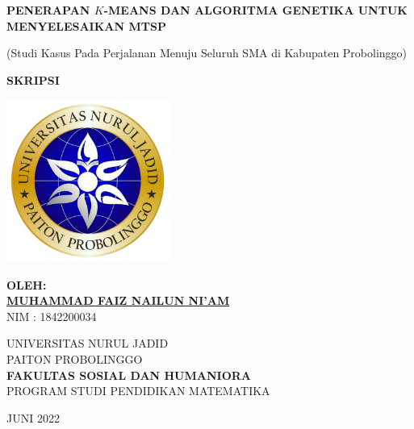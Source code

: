 \begin{titlepage}
   \begin{center}

       \textbf{PENERAPAN $K$-MEANS DAN ALGORITMA GENETIKA UNTUK MENYELESAIKAN MTSP}
       
       (Studi Kasus Pada Perjalanan Menuju Seluruh SMA di Kabupaten Probolinggo)

       \vfill
       \textbf{SKRIPSI}
       \vfill
       
       \includegraphics[width=0.4\textwidth]{Gambar/logo.png}
       
       \vfill
       
       \textbf{OLEH:}\\
       \textbf{\underline{MUHAMMAD FAIZ NAILUN NI'AM}}\\
       NIM : 1842200034

       \vfill
       
       UNIVERSITAS NURUL JADID\\
       PAITON PROBOLINGGO\\
       \textbf{FAKULTAS SOSIAL DAN HUMANIORA}\\       
       PROGRAM STUDI PENDIDIKAN MATEMATIKA\\
       
       \vfill       
       
       JUNI 2022
       
   \end{center}
\end{titlepage}